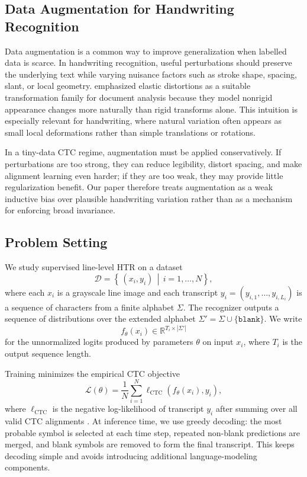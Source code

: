 \documentclass{article} %
\begin{document}
\subsection{Data Augmentation for Handwriting Recognition}
Data augmentation is a common way to improve generalization when labelled data is scarce. In handwriting recognition, useful perturbations should preserve the underlying text while varying nuisance factors such as stroke shape, spacing, slant, or local geometry. \citet{simard2003best} emphasized elastic distortions as a suitable transformation family for document analysis because they model nonrigid appearance changes more naturally than rigid transforms alone. This intuition is especially relevant for handwriting, where natural variation often appears as small local deformations rather than simple translations or rotations.

In a tiny-data CTC regime, augmentation must be applied conservatively. If perturbations are too strong, they can reduce legibility, distort spacing, and make alignment learning even harder; if they are too weak, they may provide little regularization benefit. Our paper therefore treats augmentation as a weak inductive bias over plausible handwriting variation rather than as a mechanism for enforcing broad invariance.

\subsection{Problem Setting}
We study supervised line-level HTR on a dataset
\[
\mathcal{D} = \left\{\, (x_i, y_i) \,\middle|\, i = 1, \dots, N \right\},
\]
where each \(x_i\) is a grayscale line image and each transcript \(y_i = (y_{i,1}, \dots, y_{i,L_i})\) is a sequence of characters from a finite alphabet \(\Sigma\). The recognizer outputs a sequence of distributions over the extended alphabet \(\Sigma' = \Sigma \cup \{\texttt{blank}\}\). We write
\[
f_\theta(x_i) \in \mathbb{R}^{T_i \times |\Sigma'|}
\]
for the unnormalized logits produced by parameters \(\theta\) on input \(x_i\), where \(T_i\) is the output sequence length.

Training minimizes the empirical CTC objective
\[
\mathcal{L}(\theta) = \frac{1}{N}\sum_{i=1}^{N} \ell_{\mathrm{CTC}}(f_\theta(x_i), y_i),
\]
where \(\ell_{\mathrm{CTC}}\) is the negative log-likelihood of transcript \(y_i\) after summing over all valid CTC alignments \citep{graves2006ctc}. At inference time, we use greedy decoding: the most probable symbol is selected at each time step, repeated non-blank predictions are merged, and blank symbols are removed to form the final transcript. This keeps decoding simple and avoids introducing additional language-modeling components.
\end{document}
